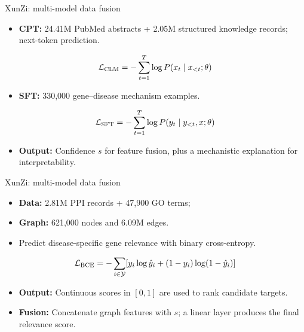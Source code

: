 \begin{frame}[t,label=md-13]{XunZi: multi-model data fusion}
\small
{}
\smallskip
\begin{itemize}
\setlength{\itemsep}{0.3em}
    \item \textbf{CPT:} 24.41M PubMed abstracts + 2.05M structured knowledge records; next-token prediction.
\end{itemize}

\[
\mathcal L_{\rm CLM}=-\sum_{t=1}^T\log P(x_t\mid x_{<t};\theta)
\]
\begin{itemize}
\setlength{\itemsep}{0.3em}
    \item \textbf{SFT:} 330,000 gene--disease mechanism examples.
\end{itemize}

\[
\mathcal L_{\rm SFT}=-\sum_{t=1}^T\log P(y_t\mid y_{<t},x;\theta)
\]
\begin{itemize}
\setlength{\itemsep}{0.3em}
    \item \textbf{Output:} Confidence $s$ for feature fusion, plus a mechanistic explanation for interpretability.
\end{itemize}
\end{frame}

\begin{frame}[t,label=md-14]{XunZi: multi-model data fusion}
\small
{}
\smallskip
\begin{itemize}
\setlength{\itemsep}{0.45em}
    \item \textbf{Data:} 2.81M PPI records + 47,900 GO terms; 
    \item \textbf{Graph:} 621,000 nodes and 6.09M edges.
    \item Predict disease-specific gene relevance with binary cross-entropy.
\end{itemize}

\[
\mathcal L_{\rm BCE}=-\sum_{i\in\mathcal Y}
  [y_i\log\hat y_i+(1-y_i)\log(1-\hat y_i)]
\]
\begin{itemize}
\setlength{\itemsep}{0.45em}
    \item \textbf{Output:} Continuous scores in $[0, 1]$ are used to rank candidate targets.
    \item \textbf{Fusion:} Concatenate graph features with $s$; a linear layer produces the final relevance score.
\end{itemize}
\end{frame}

